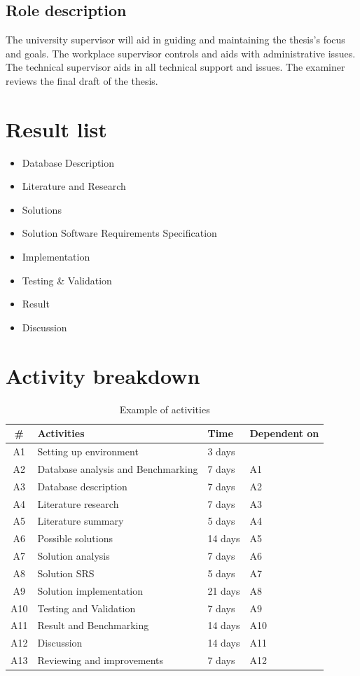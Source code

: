 \documentclass[12pt,a4paper]{article}
\begin{document}
\subsection*{Role description}
The university supervisor will aid in guiding and maintaining the thesis's focus and goals. The workplace supervisor controls and aids with administrative issues. The technical supervisor aids in all technical support and issues. The examiner reviews the final draft of the thesis. 




\section*{Result list}
\begin{itemize}
\item Database Description
\item Literature and Research
\item Solutions
\item Solution Software Requirements Specification
\item Implementation
\item Testing \& Validation
\item Result
\item Discussion
\end{itemize}

\section*{Activity breakdown}
\begin{table}[H]
    \begin{tabular}{| c | l | l | l |}
    \hline
    \# & \textbf{Activities} & \textbf{Time} & \textbf{Dependent on}\\\hline
		A1 & Setting up environment & 3 days & \\\hline
  		A2 & Database analysis and Benchmarking &  7 days & A1 \\\hline
  		A3 & Database description & 7 days & A2 \\\hline
    A4 & Literature research & 7 days & A3 \\\hline
    A5 & Literature summary & 5 days & A4 \\\hline
    A6 & Possible solutions & 14 days & A5 \\\hline
    A7 & Solution analysis & 7 days & A6 \\\hline
    A8 & Solution SRS & 5 days & A7 \\\hline
    A9 & Solution implementation & 21 days & A8 \\\hline
    A10 & Testing and Validation & 7 days & A9 \\\hline
    A11 & Result and Benchmarking & 14 days & A10 \\\hline
    A12 & Discussion & 14 days & A11 \\\hline
    A13 & Reviewing and improvements & 7 days & A12 \\\hline
    \end{tabular}
    \caption{Example of activities}
\end{table}
\end{document}
